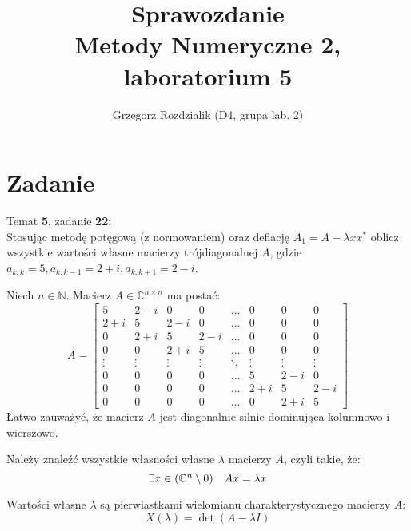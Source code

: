 \documentclass[12pt]{article}
\begin{document}
	\title{Sprawozdanie\\Metody Numeryczne 2, laboratorium 5}
	\author{Grzegorz Rozdzialik (D4, grupa lab. 2)}
	\maketitle	
	
	\section{Zadanie}
	{\Large Temat \textbf{5}, zadanie \textbf{22}:}\\
	Stosując metodę potęgową (z normowaniem) oraz deflację $A_1 = A - \lambda x x^*$ oblicz wszystkie wartości własne macierzy trójdiagonalnej $A$, gdzie $a_{k,k} = 5, a_{k, k - 1} = 2+i, a_{k, k+1} = 2-i$.
	
	Niech $n \in \mathbb{N}$. Macierz $A \in \mathbb{C}^{n \times n}$ ma postać:
	\begin{equation*}
		A =
		\begin{bmatrix}
			5      & 2 - i  & 0      & 0      & \dots  & 0      & 0      & 0      \\
			2+i    & 5      & 2-i    & 0      & \dots  & 0      & 0      & 0      \\
			0      & 2+i    & 5      & 2-i    & \dots  & 0      & 0      & 0      \\
			0      & 0      & 2+i    & 5      & \dots  & 0      & 0      & 0      \\
			\vdots & \vdots & \vdots & \vdots & \ddots & \vdots & \vdots & \vdots \\
			0      & 0      & 0      & 0      & \dots  & 5      & 2-i    & 0      \\
			0      & 0      & 0      & 0      & \dots  & 2+i    & 5      & 2-i    \\
			0      & 0      & 0      & 0      & \dots  & 0      & 2+i    & 5
		\end{bmatrix}
	\end{equation*}
	Łatwo zauważyć, że macierz $A$ jest diagonalnie silnie dominująca kolumnowo i wierszowo.
	
	Należy znaleźć wszystkie własności własne $\lambda$ macierzy $A$, czyli takie, że:
	$$\exists x \in (\mathbb{C}^n \setminus 0) \hspace{10px}  Ax = \lambda x$$
	
	Wartości własne $\lambda$ są pierwiastkami wielomianu charakterystycznego macierzy $A$:
	$$X(\lambda) = \det (A - \lambda I)$$
	
\end{document}
